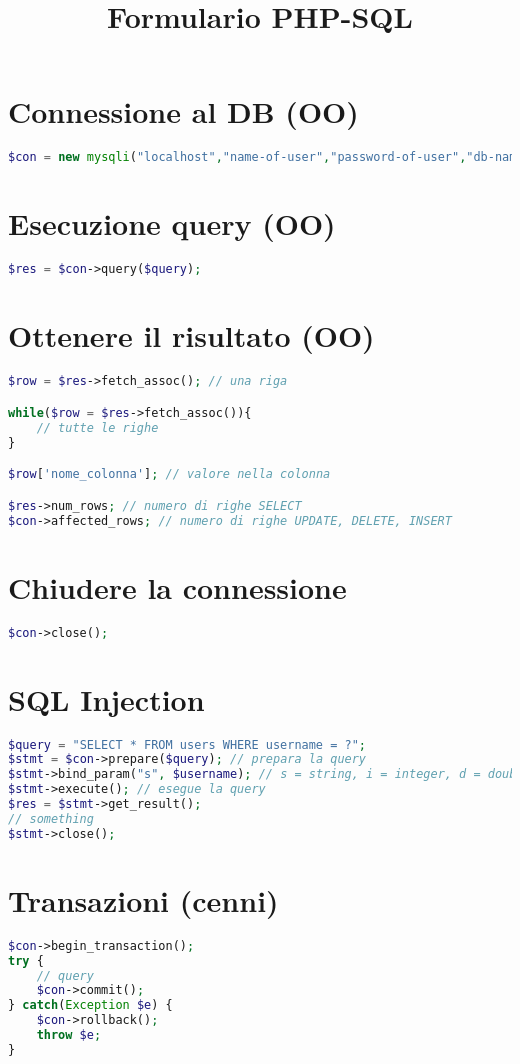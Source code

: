 \documentclass[12pt, a4paper]{article}
\title{Formulario PHP-SQL}
\date{}
\author{}
\begin{document}
\maketitle
\section{Connessione al DB (OO)}
\begin{lstlisting}[language=PHP]
$con = new mysqli("localhost","name-of-user","password-of-user","db-name");
\end{lstlisting}
\section{Esecuzione query (OO)}
\begin{lstlisting}[language=PHP]
$res = $con->query($query);
\end{lstlisting}
\section{Ottenere il risultato (OO)}
\begin{lstlisting}[language=PHP]
$row = $res->fetch_assoc(); // una riga

while($row = $res->fetch_assoc()){
    // tutte le righe
}

$row['nome_colonna']; // valore nella colonna

$res->num_rows; // numero di righe SELECT
$con->affected_rows; // numero di righe UPDATE, DELETE, INSERT
\end{lstlisting}
\section{Chiudere la connessione}
\begin{lstlisting}[language=PHP]
$con->close();
\end{lstlisting}
\section{SQL Injection}
\begin{lstlisting}[language=PHP]
$query = "SELECT * FROM users WHERE username = ?";
$stmt = $con->prepare($query); // prepara la query
$stmt->bind_param("s", $username); // s = string, i = integer, d = double, b = blob
$stmt->execute(); // esegue la query
$res = $stmt->get_result();
// something
$stmt->close();
\end{lstlisting}
\section{Transazioni (cenni)}
\begin{lstlisting}[language=PHP]
$con->begin_transaction();
try {
    // query
    $con->commit();
} catch(Exception $e) {
    $con->rollback();
    throw $e;
}
\end{lstlisting}
\end{document}
